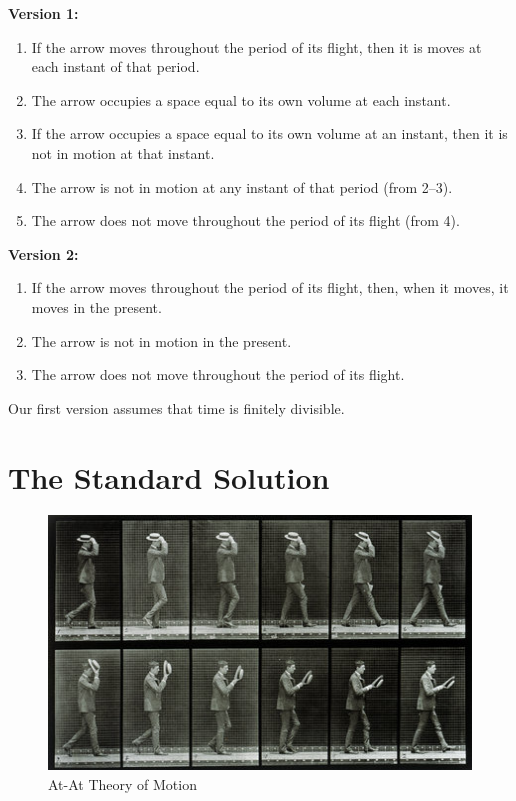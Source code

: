 \documentclass[oneside]{article}
\begin{document}
\noindent \textbf{Version 1:}\begin{enumerate}
\item If the arrow moves throughout the period of its flight, then it is moves at each instant of that period. 
\item The arrow occupies a space equal to its own volume at each instant. 
\item If the arrow occupies a space equal to its own volume at an instant, then it is not in motion at that instant. 
\item The arrow is not in motion at any instant of that period (from 2--3).
\item The arrow does not move throughout the period of its flight (from 4).
\end{enumerate}


\noindent \textbf{Version 2:}

\begin{enumerate}
\item If the arrow moves throughout the period of its flight, then, when it moves, it moves in the present. 
\item The arrow is not in motion in the present. 
\item The arrow does not move throughout the period of its flight. 
\end{enumerate}

Our first version assumes that time is finitely divisible. 

 

\section{The Standard Solution}

\begin{figure}
  \includegraphics[width=\linewidth]{motion.jpg}
  \caption{At-At Theory of Motion}
\end{figure}
\end{document}
